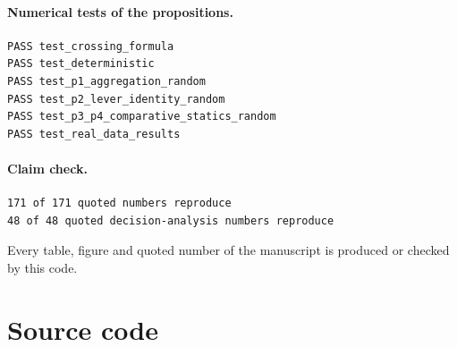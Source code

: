 \documentclass[10pt,a4paper]{article}
\begin{document}
\paragraph{Numerical tests of the propositions.}
\begin{lstlisting}[numbers=none]
PASS test_crossing_formula
PASS test_deterministic
PASS test_p1_aggregation_random
PASS test_p2_lever_identity_random
PASS test_p3_p4_comparative_statics_random
PASS test_real_data_results
\end{lstlisting}

\paragraph{Claim check.}
\begin{lstlisting}[numbers=none]
171 of 171 quoted numbers reproduce
48 of 48 quoted decision-analysis numbers reproduce
\end{lstlisting}
Every table, figure and quoted number of the manuscript is produced or checked by this code.

\section{Source code}
\end{document}
